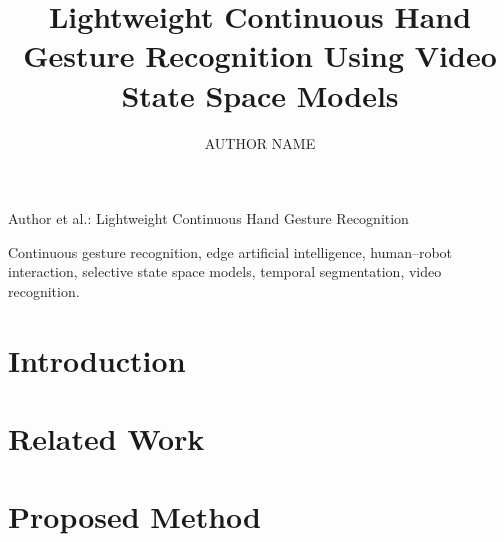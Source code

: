 \documentclass{ieeeaccess}
\begin{document}
\title{Lightweight Continuous Hand Gesture Recognition Using Video State Space Models}
\author{\uppercase{Author Name}}
\address[1]{Institution and department to be confirmed, Hanoi, Vietnam}
{Author et al.: Lightweight Continuous Hand Gesture Recognition}

\begin{abstract}
\end{abstract}

\begin{keywords}
Continuous gesture recognition, edge artificial intelligence, human--robot interaction, selective state space models, temporal segmentation, video recognition.
\end{keywords}
\titlepgskip=-15pt
\maketitle

\section{Introduction}
\label{sec:introduction}

\section{Related Work}
\label{sec:related}

\section{Proposed Method}
\label{sec:method}
\end{document}
